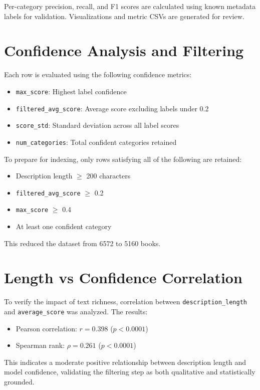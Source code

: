Per-category precision, recall, and F1 scores are calculated using known metadata labels for validation. Visualizations and metric CSVs are generated for review.

\section{Confidence Analysis and Filtering}
Each row is evaluated using the following confidence metrics:
\begin{itemize}
  \item \texttt{max\_score}: Highest label confidence
  \item \texttt{filtered\_avg\_score}: Average score excluding labels under 0.2
  \item \texttt{score\_std}: Standard deviation across all label scores
  \item \texttt{num\_categories}: Total confident categories retained
\end{itemize}

To prepare for indexing, only rows satisfying all of the following are retained:
\begin{itemize}
  \item Description length $\geq$ 200 characters
  \item \texttt{filtered\_avg\_score} $\geq$ 0.2
  \item \texttt{max\_score} $\geq$ 0.4
  \item At least one confident category
\end{itemize}

This reduced the dataset from 6572 to 5160 books.

\section{Length vs Confidence Correlation}
To verify the impact of text richness, correlation between \texttt{description\_length} and \texttt{average\_score} was analyzed. The results:

\begin{itemize}
  \item Pearson correlation: $r=0.398$ ($p<0.0001$)
  \item Spearman rank: $\rho=0.261$ ($p<0.0001$)
\end{itemize}

This indicates a moderate positive relationship between description length and model confidence, validating the filtering step as both qualitative and statistically grounded.
